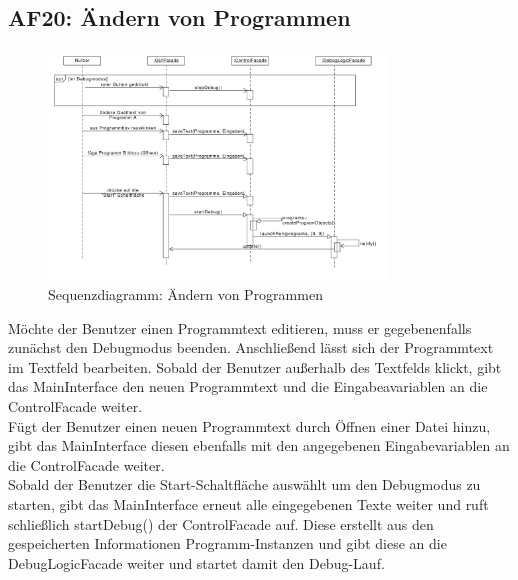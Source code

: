 \documentclass[parskip=full]{scrartcl}
\begin{document}
\subsection{AF20: Ändern von Programmen}
\begin{figure}[!h]
\centering
\includegraphics[width=0.8\textwidth]{diagrammIdeenUmlet/SequenceDiagrams/seq_AF20PDF.pdf}
\caption{Sequenzdiagramm: Ändern von Programmen}
\end{figure}
Möchte der Benutzer einen Programmtext editieren, muss er gegebenenfalls zunächst den Debugmodus beenden.
Anschließend lässt sich der Programmtext im Textfeld bearbeiten. Sobald der Benutzer außerhalb des
Textfelds klickt, gibt das MainInterface den neuen Programmtext und die Eingabeavariablen an die ControlFacade weiter. \\
Fügt der Benutzer einen neuen Programmtext durch Öffnen einer Datei hinzu, gibt das MainInterface diesen ebenfalls
mit den angegebenen Eingabevariablen an die ControlFacade weiter.\\
Sobald der Benutzer die Start-Schaltfläche auswählt um den Debugmodus zu starten, gibt das MainInterface erneut
alle eingegebenen Texte weiter und ruft schließlich startDebug() der ControlFacade auf. Diese erstellt aus den gespeicherten Informationen
Programm-Instanzen und gibt diese an die DebugLogicFacade weiter und startet damit den Debug-Lauf.

\newpage
\end{document}
